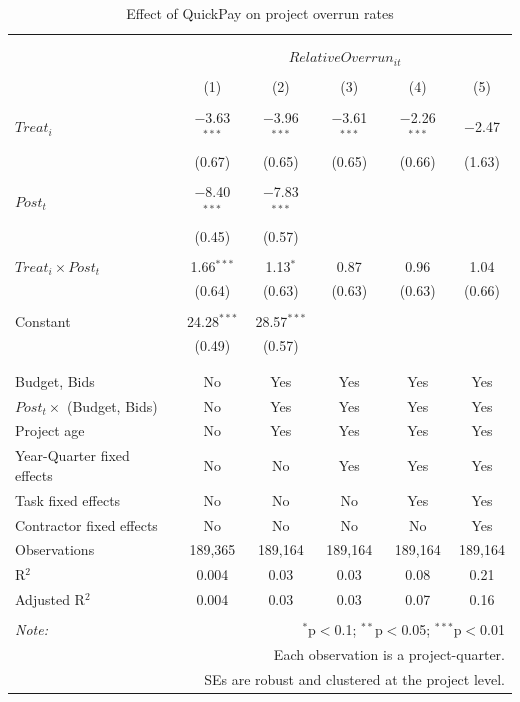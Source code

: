\documentclass[
]{article}
\begin{document}
\begin{table}[H] \centering 
  \caption{Effect of QuickPay on project overrun rates} 
  \label{} 
\small 
\begin{tabular}{@{\extracolsep{-2pt}}lccccc} 
\\[-1.8ex]\hline 
\hline \\[-1.8ex] 
\\[-1.8ex] & \multicolumn{5}{c}{$RelativeOverrun_{it}$} \\ 
\\[-1.8ex] & (1) & (2) & (3) & (4) & (5)\\ 
\hline \\[-1.8ex] 
 $Treat_i$ & $-$3.63$^{***}$ & $-$3.96$^{***}$ & $-$3.61$^{***}$ & $-$2.26$^{***}$ & $-$2.47 \\ 
  & (0.67) & (0.65) & (0.65) & (0.66) & (1.63) \\ 
  & & & & & \\ 
 $Post_t$ & $-$8.40$^{***}$ & $-$7.83$^{***}$ &  &  &  \\ 
  & (0.45) & (0.57) &  &  &  \\ 
  & & & & & \\ 
 $Treat_i \times Post_t$ & 1.66$^{***}$ & 1.13$^{*}$ & 0.87 & 0.96 & 1.04 \\ 
  & (0.64) & (0.63) & (0.63) & (0.63) & (0.66) \\ 
  & & & & & \\ 
 Constant & 24.28$^{***}$ & 28.57$^{***}$ &  &  &  \\ 
  & (0.49) & (0.57) &  &  &  \\ 
  & & & & & \\ 
\hline \\[-1.8ex] 
Budget, Bids & No & Yes & Yes & Yes & Yes \\ 
$Post_t \times$  (Budget, Bids) & No & Yes & Yes & Yes & Yes \\ 
Project age & No & Yes & Yes & Yes & Yes \\ 
Year-Quarter fixed effects & No & No & Yes & Yes & Yes \\ 
Task fixed effects & No & No & No & Yes & Yes \\ 
Contractor fixed effects & No & No & No & No & Yes \\ 
Observations & 189,365 & 189,164 & 189,164 & 189,164 & 189,164 \\ 
R$^{2}$ & 0.004 & 0.03 & 0.03 & 0.08 & 0.21 \\ 
Adjusted R$^{2}$ & 0.004 & 0.03 & 0.03 & 0.07 & 0.16 \\ 
\hline 
\hline \\[-1.8ex] 
\textit{Note:}  & \multicolumn{5}{r}{$^{*}$p$<$0.1; $^{**}$p$<$0.05; $^{***}$p$<$0.01} \\ 
 & \multicolumn{5}{r}{Each observation is a project-quarter.} \\ 
 & \multicolumn{5}{r}{SEs are robust and clustered at the project level.} \\ 
\end{tabular} 
\end{table}
\end{document}

